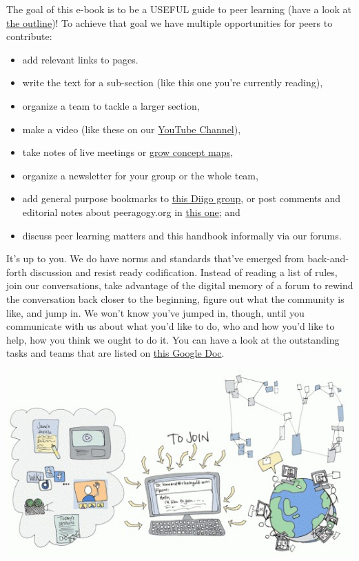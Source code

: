 The goal of this e-book is to be a USEFUL guide to peer learning (have a
look at
\href{http://socialmediaclassroom.com/host/peeragogy/wiki/initial-outline-source-book}{the
outline})! To achieve that goal we have multiple opportunities for peers
to contribute:

\begin{itemize}
\item
  add relevant links to pages.
\item
  write the text for a sub-section (like this one you're currently
  reading),
\item
  organize a team to tackle a larger section,
\item
  make a video (like these on our
  \href{http://www.youtube.com/channel/UCIQY4ja8e4Br-i9U5KnmyZQ}{YouTube
  Channel}),
\item
  take notes of live meetings or
  \href{http://cmapspublic3.ihmc.us/rid=1K81VLSK7-1RL0RQ4-WZK/Peeragogy\%20Cmap.cmap}{grow
  concept maps,}
\item
  organize a newsletter for your group or the whole team,
\item
  add general purpose bookmarks to
  \href{http://groups.diigo.com/group/peeragogy-handbook}{this Diigo
  group}, or post comments and editorial notes about peeragogy.org in
  \href{http://groups.diigo.com/group/peering-into-peeragogy\%20}{this
  one}; and
\item
  discuss peer learning matters and this handbook informally via our
  forums.
\end{itemize}

It's up to you. We do have norms and standards that've emerged from
back-and-forth discussion and resist ready codification. Instead of
reading a list of rules, join our conversations, take advantage of the
digital memory of a forum to rewind the conversation back closer to the
beginning, figure out what the community is like, and jump in. We won't
know you've jumped in, though, until you communicate with us about what
you'd like to do, who and how you'd like to help, how you think we ought
to do it. You can have a look at the outstanding tasks and teams that
are listed on
\href{https://docs.google.com/document/d/1\_2I-z-Pt5NUKk-fpy4jsqxFeXbWS4ao4sIhkxCcRVeI/edit\#}{this
Google Doc}.

\begin{center}
\href{http://peeragogy.org/wp-content/uploads/2012/03/lots\_going\_on\_color\_1000.gif}{\includegraphics[width=.9\textwidth]{../pictures/lots_going_on.jpg}}
\end{center}

